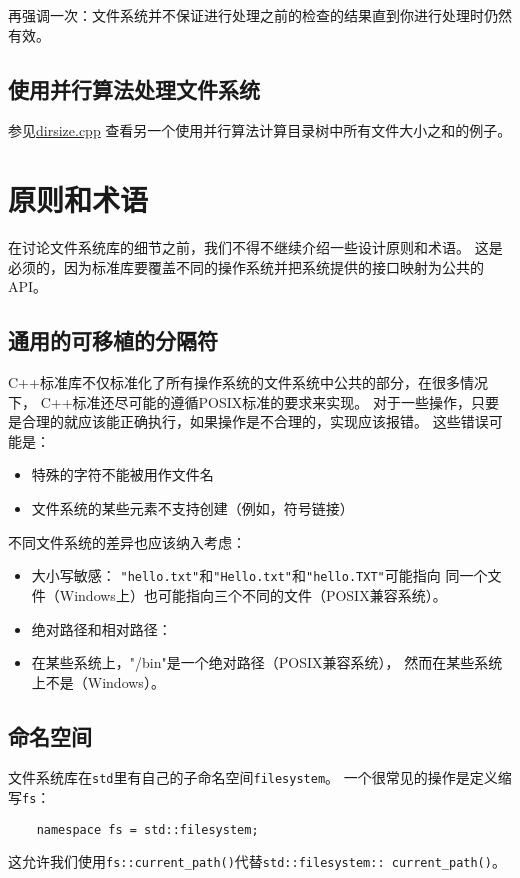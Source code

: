 再强调一次：文件系统并不保证进行处理之前的检查的结果直到你进行处理时仍然有效。

\subsection{使用并行算法处理文件系统}
参见\hyperref[ch22.6.1.4]{dirsize.cpp}
查看另一个使用并行算法计算目录树中所有文件大小之和的例子。


\section{原则和术语}
在讨论文件系统库的细节之前，我们不得不继续介绍一些设计原则和术语。
这是必须的，因为标准库要覆盖不同的操作系统并把系统提供的接口映射为公共的API。

\subsection{通用的可移植的分隔符}
C++标准库不仅标准化了所有操作系统的文件系统中公共的部分，在很多情况下，
C++标准还尽可能的遵循POSIX标准的要求来实现。
对于一些操作，只要是合理的就应该能正确执行，如果操作是不合理的，实现应该报错。
这些错误可能是：
\begin{itemize}
    \item 特殊的字符不能被用作文件名
    \item 文件系统的某些元素不支持创建（例如，符号链接）
\end{itemize}
不同文件系统的差异也应该纳入考虑：
\begin{itemize}
    \item 大小写敏感：
    \texttt{"hello.txt"}和\texttt{"Hello.txt"}和\texttt{"hello.TXT"}可能指向
    同一个文件（Windows上）也可能指向三个不同的文件（POSIX兼容系统）。
    \item 绝对路径和相对路径：
    \item 在某些系统上，"/bin"是一个绝对路径（POSIX兼容系统），
    然而在某些系统上不是（Windows）。
\end{itemize}

\subsection{命名空间}
文件系统库在\texttt{std}里有自己的子命名空间\texttt{filesystem}。
一个很常见的操作是定义缩写\texttt{fs}：
\begin{lstlisting}
    namespace fs = std::filesystem;
\end{lstlisting}
这允许我们使用\texttt{fs::current\_path()}代替\texttt{std::filesystem::
current\_path()}。

